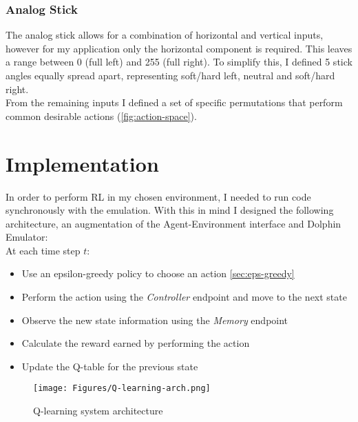 \subsubsection{Analog Stick}
The analog stick allows for a combination of horizontal and vertical inputs, however for my application only the horizontal component is required. This leaves a range between 0 (full left) and 255 (full right). To simplify this, I defined 5 stick angles equally spread apart, representing soft/hard left, neutral and soft/hard right. 
\\
From the remaining inputs I defined a set of specific permutations that perform common desirable actions (\ref{fig:action-space}).

\section{Implementation}
In order to perform RL in my chosen environment, I needed to run code synchronously with the emulation. With this in mind I designed the following architecture, an augmentation of the Agent-Environment interface and Dolphin Emulator:\\At each time step $t$:
\begin{itemize}
    \item Use an epsilon-greedy policy to choose an action \ref{sec:eps-greedy}
    \item Perform the action using the \textit{Controller} endpoint and move to the next state
    \item Observe the new state information using the \textit{Memory} endpoint
    \item Calculate the reward earned by performing the action
    \item Update the Q-table for the previous state
\end{itemize}
\begin{figure}[hb]
    \centering
    \texttt{[image: Figures/Q-learning-arch.png]}
    \caption{Q-learning system architecture}
    \label{fig:q-learning-arch}
\end{figure}
